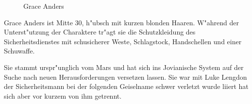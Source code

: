 \begin{figure}
    \caption{Grace Anders}
\end{figure}

Grace Anders ist Mitte 30, h"ubsch mit kurzen blonden Haaren. W"ahrend der Unterst"utzung der Charaktere tr"agt sie die Schutzkleidung des Sicherheitsdienstes mit schu\3sicherer Weste, Schlagstock, Handschellen und einer Schu\3waffe. 

Sie stammt urspr"unglich vom Mars und hat sich ins Jovianische System auf der Suche nach neuen Herausforderungen versetzen lassen. Sie war mit Luke Lengdon der Sicherheitsmann bei der folgenden Geiselname schwer verletzt wurde liiert hat sich aber vor kurzem von ihm getrennt.

